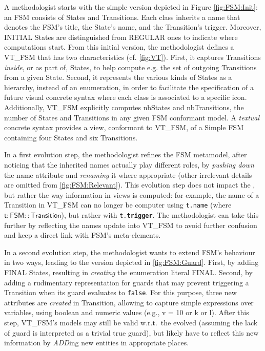 A methodologist starts with the simple version depicted in Figure \ref{fig:FSM:Init}:
an \textsf{FSM} consists of \textsf{State}s and \textsf{Transition}s. Each class
inherits a \textsf{name} that denotes the \textsf{FSM}'s title, the \textsf{State}'s
name, and the \textsf{Transition}'s trigger. Moreover, \textsf{INITIAL} \textsf{State}s
are distinguished from \textsf{REGULAR} ones to indicate where computations start.
From this initial version, the methodologist defines a \viewtype \textsf{VT\_FSM}
that has two characteristics (cf. \autoref{fig:VT}). First, it captures \textsf{Transition}s \emph{inside},
or as part of, \textsf{State}s, to help compute e.g. the set of outgoing 
\textsf{Transition}s from a given \textsf{State}. Second, it represents the various
\textsf{kind}s of \textsf{State}s as a hierarchy, instead of an enumeration,
in order to facilitate the specification of a future visual concrete syntax where
each class is associated to a specific icon.
Additionally, \textsf{VT\_FSM} explicitly computes \textsf{nbStates} and 
\textsf{nbTransitions}, the number of \textsf{State}s and \textsf{Transition}s 
in any given \textsf{FSM} conformant model. A \emph{textual} concrete syntax 
provides a view, conformant to \textsf{VT\_FSM}, of a \textsf{Simple FSM} containing
four \textsf{State}s and six \textsf{Transition}s.


In a first evolution step, the methodologist refines the \textsf{FSM} metamodel,
after noticing that the inherited \textsf{name}s actually play different roles,
by  \emph{pushing down} the \textsf{name} attribute and \emph{renaming} it where
appropriate (other irrelevant details are omitted from \autoref{fig:FSM:Relevant}). 
This evolution step does not impact the \viewtypes, but rather the way information
in views is computed: for example, the \textsf{name} of a \textsf{Transition} in
\textsf{VT\_FSM} can no longer be computer using \texttt{t.name} (where 
$\mathsf{t : FSM::Transition}$), but rather with \texttt{t.\textbf{trigger}}. 
The methodologist can take this further by reflecting the \textsf{name}s update
into \textsf{VT\_FSM} to avoid further confusion and keep a direct link with
\textsf{FSM}'s meta-elements.

In a second evolution step, the methodologist wants to extend \textsf{FSM}'s 
behaviour in two ways, leading to the version depicted in \autoref{fig:FSM:Guard}. First, by adding \textsf{FINAL} \textsf{State}s,
resulting in \emph{creating} the enumeration literal \textsf{FINAL}.
Second, by adding a rudimentary representation for guards that may prevent 
triggering a \textsf{Transition} when its guard evaluates to \texttt{false}. 
For this purpose, three new attributes are \emph{created} in \textsf{Transition}, allowing to capture
simple expressions over \textsf{var}iables, using boolean and numeric \textsf{value}s
(e.g., \textsf{v = 10} or \textsf{k or l}). After this step, \textsf{VT\_FSM}'s
models may still be valid w.r.t.~the evolved \metamodel (assuming the lack of 
guard is interpreted as a trivial \textsf{true} guard),
but \viewtypes likely have to reflect this new information by \emph{ADD}ing new entities in appropriate places.

